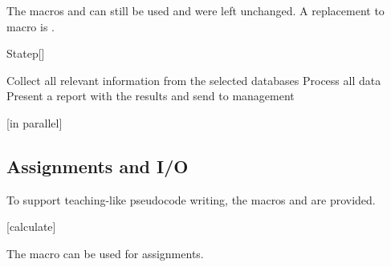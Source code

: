 \documentclass[a4paper, 11pt]{article}
\begin{document}
The macros  and  can still be used and were left unchanged. A replacement to macro  is .

\begin{macro}{Statep}[]
\end{macro}

\begin{tcblisting}{}
    \begin{minipage}{6cm}
        \begin{algorithmic}
            \State Collect all relevant information from the selected databases
            \State Process all data
            \State Present a report with the results and send to management
        \end{algorithmic}

        \bigskip
        \begin{algorithmic}
            [in parallel]
        \end{algorithmic}
    \end{minipage}
\end{tcblisting}

\subsection{Assignments and I/O}

To support teaching-like pseudocode writing, the macros  and  are provided.

\begin{tcblisting}{}
    \begin{algorithmic}
        [calculate]
    \end{algorithmic}
\end{tcblisting}

The macro  can be used for assignments.

\end{document}
